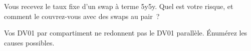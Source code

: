 \begin{interviewq}\label{iq:m2:interest-rate-swaps:5}
Vous recevez le taux fixe d'un swap à terme 5y5y. Quel est votre risque, et comment
le couvrez-vous avec des swaps au pair~?
\end{interviewq}

\begin{interviewq}\label{iq:m2:interest-rate-swaps:6}
Vos DV01 par compartiment ne redonnent pas le DV01 parallèle. Énumérez les causes possibles.
\end{interviewq}
